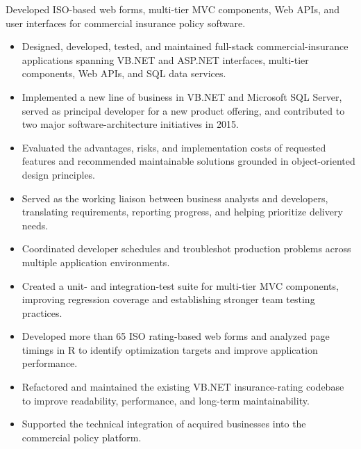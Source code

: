 Developed ISO-based web forms, multi-tier MVC components, Web APIs, and user interfaces for commercial insurance policy software.
\begin{itemize}
  \item Designed, developed, tested, and maintained full-stack commercial-insurance applications spanning VB.NET and ASP.NET interfaces, multi-tier components, Web APIs, and SQL data services.
  \item Implemented a new line of business in VB.NET and Microsoft SQL Server, served as principal developer for a new product offering, and contributed to two major software-architecture initiatives in 2015.
  \item Evaluated the advantages, risks, and implementation costs of requested features and recommended maintainable solutions grounded in object-oriented design principles.
  \item Served as the working liaison between business analysts and developers, translating requirements, reporting progress, and helping prioritize delivery needs.
  \item Coordinated developer schedules and troubleshot production problems across multiple application environments.
  \item Created a unit- and integration-test suite for multi-tier MVC components, improving regression coverage and establishing stronger team testing practices.
  \item Developed more than 65 ISO rating-based web forms and analyzed page timings in R to identify optimization targets and improve application performance.
  \item Refactored and maintained the existing VB.NET insurance-rating codebase to improve readability, performance, and long-term maintainability.
  \item Supported the technical integration of acquired businesses into the commercial policy platform.
\end{itemize}

